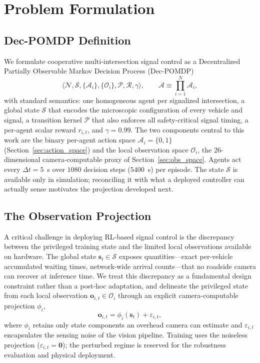 \section{Problem Formulation}
\label{sec:problem}

\subsection{Dec-POMDP Definition}
\label{sec:decpomdp}
We formulate cooperative multi-intersection signal control as a Decentralized
Partially Observable Markov Decision Process
(Dec-POMDP)~\cite{oliehoek2016_decpomdp}
\begin{equation}
  \langle \mathcal{N}, \mathcal{S}, \{\mathcal{A}_i\}, \{\mathcal{O}_i\},
  \mathcal{P}, \mathcal{R}, \gamma \rangle,
  \qquad
  \mathcal{A} \equiv \prod_{i=1}^{N} \mathcal{A}_i,
  \label{eq:joint_action}
\end{equation}
with standard semantics: one homogeneous agent per signalized intersection, a global
state $\mathcal{S}$ that encodes the microscopic configuration of every vehicle and
signal, a transition kernel $\mathcal{P}$ that also enforces all safety-critical signal
timing, a per-agent scalar reward $r_{i,t}$, and $\gamma = 0.99$. The two components
central to this work are the binary per-agent action space $\mathcal{A}_i = \{0, 1\}$
(Section~\ref{sec:action_space}) and the local observation space $\mathcal{O}_i$, the
$26$-dimensional camera-computable proxy of Section~\ref{sec:obs_space}. Agents act
every $\Delta t = 5$~s over $1080$ decision steps ($5400$~s) per episode. The state
$\mathcal{S}$ is available only in simulation; reconciling it with what a deployed
controller can actually sense motivates the projection developed next.

\subsection{The Observation Projection}
\label{sec:projection}
A critical challenge in deploying RL-based signal control is the discrepancy between
the privileged training state and the limited local observations available on
hardware. The global state $\mathbf{s}_t \in \mathcal{S}$ exposes quantities---exact
per-vehicle accumulated waiting times, network-wide arrival counts---that no roadside
camera can recover at inference time. We treat this discrepancy as a fundamental
design constraint rather than a post-hoc adaptation, and delineate the privileged
state from each local observation $\mathbf{o}_{i,t} \in \mathcal{O}_i$ through an
explicit camera-computable projection $\phi_i$,
\begin{equation}
  \mathbf{o}_{i,t} = \phi_i(\mathbf{s}_t) + \varepsilon_{i,t},
  \label{eq:projection}
\end{equation}
where $\phi_i$ retains only state components an overhead camera can estimate and
$\varepsilon_{i,t}$ encapsulates the sensing noise of the vision pipeline. Training
uses the noiseless projection ($\varepsilon_{i,t} = \mathbf{0}$); the perturbed regime
is reserved for the robustness evaluation and physical deployment.

